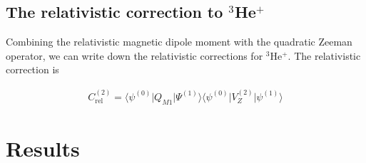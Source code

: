         \subsection{The relativistic correction to $^3$He$^+$}\label{sec:Relativistic_Correction}
            Combining the relativistic magnetic dipole moment with the quadratic Zeeman operator, we can write down the relativistic corrections for $^3$He$^+$. The relativistic correction is

            \begin{align}
                C_{\text{rel}}^{(2)} = \langle \psi^{(0)} \vert Q_{M1} \vert \varPsi^{(1)} \rangle \langle \psi^{(0)} \vert V_Z^{(2)} \vert \psi^{(1)} \rangle
            \end{align}

    \section{Results}\label{sec:results}





